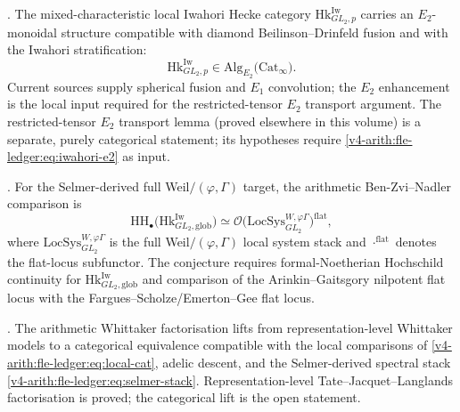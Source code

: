 \begin{conjecture}
\label{v4-arith:fle-ledger:conj:iwahori-e2}
\ClaimStatusConjectured. The mixed-characteristic local Iwahori
Hecke category
\(\mathrm{Hk}^{\mathrm{Iw}}_{GL_{2},p}\)
carries an \(E_{2}\)-monoidal structure compatible with diamond
Beilinson--Drinfeld fusion and with the Iwahori stratification:
\begin{equation}
\label{v4-arith:fle-ledger:eq:iwahori-e2}
\mathrm{Hk}^{\mathrm{Iw}}_{GL_{2},p}
\in
\mathrm{Alg}_{E_{2}}\bigl(\mathrm{Cat}_{\infty}\bigr).
\end{equation}
Current sources supply spherical fusion and \(E_{1}\) convolution; the
\(E_{2}\) enhancement is the local input required for the
restricted-tensor \(E_{2}\) transport argument. The restricted-tensor
\(E_{2}\) transport lemma (proved elsewhere in this volume)
is a separate, purely categorical statement; its hypotheses require
\eqref{v4-arith:fle-ledger:eq:iwahori-e2} as input.
\end{conjecture}

\begin{conjecture}
\label{v4-arith:fle-ledger:conj:full-bzn}
\ClaimStatusConjectured.
For the Selmer-derived full Weil\(/(\varphi,\Gamma)\) target, the
arithmetic Ben-Zvi--Nadler comparison is
\begin{equation}
\label{v4-arith:fle-ledger:eq:bzn}
\mathrm{HH}_{\bullet}\bigl(\mathrm{Hk}^{\mathrm{Iw}}_{GL_{2},\mathrm{glob}}\bigr)
\simeq
\mathcal{O}\bigl(\mathrm{LocSys}^{W,\varphi\Gamma}_{GL_{2}}\bigr)^{\mathrm{flat}},
\end{equation}
where \(\mathrm{LocSys}^{W,\varphi\Gamma}_{GL_{2}}\) is the full
Weil\(/(\varphi,\Gamma)\) local system stack and
\({\cdot}^{\mathrm{flat}}\) denotes the flat-locus subfunctor.
The conjecture requires formal-Noetherian Hochschild continuity for
\(\mathrm{Hk}^{\mathrm{Iw}}_{GL_{2},\mathrm{glob}}\) and
comparison of the Arinkin--Gaitsgory nilpotent flat locus with the
Fargues--Scholze/Emerton--Gee flat locus.
\end{conjecture}

\begin{conjecture}
\label{v4-arith:fle-ledger:conj:whittaker}
\ClaimStatusConjectured.
The arithmetic Whittaker factorisation lifts from
representation-level Whittaker models to a categorical equivalence
compatible with the local comparisons of
\eqref{v4-arith:fle-ledger:eq:local-cat}, adelic descent, and the
Selmer-derived spectral stack
\eqref{v4-arith:fle-ledger:eq:selmer-stack}.
Representation-level Tate--Jacquet--Langlands factorisation is proved;
the categorical lift is the open statement.
\end{conjecture}


